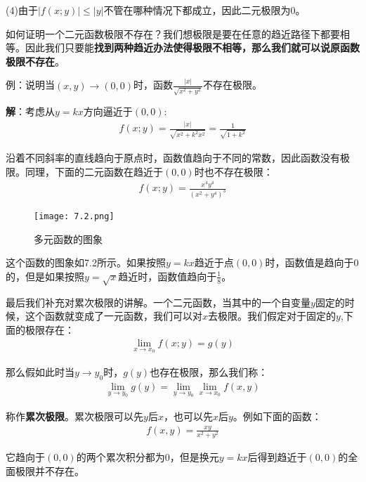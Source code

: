 \documentclass{ctexart}
\let\oldtextbf\textbf %
\renewcommand{\textbf}[1]{\textcolor{btex}{\oldtextbf{#1}}} %
\begin{document}
(4)由于$|f(x;y)|\leq |y|$不管在哪种情况下都成立，因此二元极限为0。


如何证明一个二元函数极限不存在？我们想极限是要在任意的趋近路径下都要相等。因此我们只要能\textbf{找到两种趋近办法使得极限不相等，那么我们就可以说原函数极限不存在}。

例：说明当$(x,y)\to(0,0)$时，函数$\frac{|x|}{\sqrt{x^2+y^2}}$不存在极限。

\textbf{解}：考虑从$y=kx$方向逼近于$(0,0)$:
\begin{align*}
    f(x;y)=\frac{|x|}{\sqrt{x^2+k^2x^2}}=\frac{1}{\sqrt{1+k^2}}
\end{align*}

沿着不同斜率的直线趋向于原点时，函数值趋向于不同的常数，因此函数没有极限。同理，下面的二元函数在趋近于$(0,0)$时也不存在极限：
\begin{align*}
    f(x;y)=\frac{x^4y^4}{(x^2+y^4)^3}
\end{align*}

\begin{figure}[H]    
\centering     
\renewcommand{\figurename}{图}     
\renewcommand{\thefigure}{7.2}    
\begin{myimagebox}[width=0.75\textwidth] %
\texttt{[image: 7.2.png]} %
\end{myimagebox}     
\caption{\label{fig:7.2}多元函数的图象}   
\end{figure}

这个函数的图象如7.2所示。如果按照$y=kx$趋近于点$(0,0)$时，函数值是趋向于$0$的，但是如果按照$y=\sqrt{x}$趋近时，函数值趋向于$\frac{1}{8}$。

最后我们补充对累次极限的讲解。一个二元函数，当其中的一个自变量$y$固定的时候，这个函数就变成了一元函数，我们可以对$x$去极限。我们假定对于固定的$y$,下面的极限存在：
\begin{align*}
    \lim_{x\to x_0}f(x;y)=g(y)
\end{align*}

那么假如此时当$y\to y_0$时，$g(y)$也存在极限，那么我们称：
\begin{align*}
    \lim_{y\to y_0}g(y)=\lim_{y\to y_0}\lim_{x\to x_0}f(x,y)
\end{align*}

称作\textbf{累次极限}。累次极限可以先$y$后$x$，也可以先$x$后$y$。例如下面的函数：
\begin{align*}
    f(x,y)=\frac{xy}{x^2+y^2}
\end{align*}

它趋向于$(0,0)$的两个累次积分都为0，但是换元$y=kx$后得到趋近于$(0,0)$的全面极限并不存在。
\end{document}
